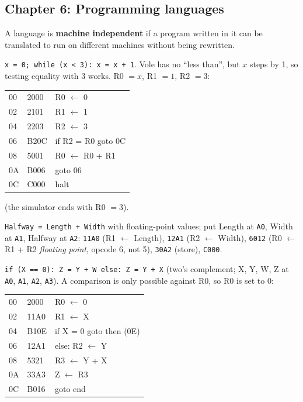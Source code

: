 \documentclass{fkt-notes}
\newcommand{\hx}[1]{\texttt{#1}}
\begin{document}
\subsection*{Chapter 6: Programming languages}
\begin{description}[leftmargin=0pt,labelindent=0pt,itemsep=2pt]
  \item[6.1] A language is \textbf{machine independent} if a program written in it can be translated to run on different machines without being rewritten.
  \item[6.2] \texttt{x = 0; while (x < 3): x = x + 1}. Vole has no ``less than'', but $x$ steps by 1, so testing equality with $3$ works. R0 $=x$, R1 $=1$, R2 $=3$:
        \begin{center}\small\ttfamily
          \begin{tabular}{@{}lll@{}}
            00 & 2000 & R0 $\leftarrow$ 0  \\ 02 & 2101 & R1 $\leftarrow$ 1 \\ 04 & 2203 & R2 $\leftarrow$ 3 \\
            06 & B20C & if R2 = R0 goto 0C \\ 08 & 5001 & R0 $\leftarrow$ R0 + R1 \\ 0A & B006 & goto 06 \\ 0C & C000 & halt
          \end{tabular}
        \end{center}
        (the simulator ends with R0 $=3$).
  \item[6.3] \texttt{Halfway = Length + Width} with floating-point values; put Length at \hx{A0}, Width at \hx{A1}, Halfway at \hx{A2}: \hx{11A0} (R1 $\leftarrow$ Length),
        \hx{12A1} (R2 $\leftarrow$ Width), \hx{6012} (R0 $\leftarrow$ R1 + R2 \emph{floating point}, opcode 6, not 5), \hx{30A2} (store), \hx{C000}.
  \item[6.4] \texttt{if (X == 0): Z = Y + W else: Z = Y + X} (two's complement; X, Y, W, Z at \hx{A0}, \hx{A1}, \hx{A2}, \hx{A3}). A comparison is only possible against R0, so R0 is
        set to $0$:
        \begin{center}\small\ttfamily
          \begin{tabular}{@{}lll@{}}
            00 & 2000 & R0 $\leftarrow$ 0       \\ 02 & 11A0 & R1 $\leftarrow$ X \\ 04 & B10E & if X = 0 goto then (0E) \\
            06 & 12A1 & else: R2 $\leftarrow$ Y \\ 08 & 5321 & R3 $\leftarrow$ Y + X \\ 0A & 33A3 & Z $\leftarrow$ R3 \\ 0C & B016 & goto end \\

\end{tabular}
\end{center}
\end{description}
\end{document}
